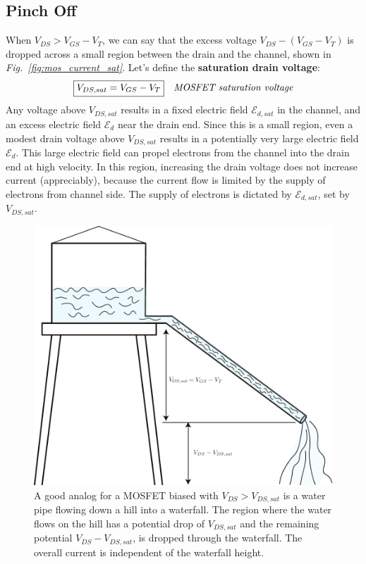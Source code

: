 \subsection{Pinch Off}
When $V_{DS} > V_{GS}-V_T$, we can say that the excess voltage $V_{DS} - (V_{GS}-V_T)$ is dropped across a small region between the drain and the channel, shown in \emph{Fig.~\ref{fig:mos_current_sat}}.  Let's define the \textbf{saturation drain voltage}:
    \begin{align}
        \Aboxed{V_{DS,sat} &= V_{GS} - V_T}
        &\textit{MOSFET saturation voltage}
        \label{eq:saturation_voltage}
    \end{align}
Any voltage above $V_{DS,sat}$ results in a fixed electric field $\mathcal{E}_{d,sat}$ in the channel, and an excess electric field $\mathcal{E}_d$ near the drain end.  Since this is a small region, even a modest drain voltage above $V_{DS,sat}$ results in a potentially very large electric field $\mathcal{E}_d$.  This large electric field can propel electrons from the channel into the drain end at high velocity.  In this region, increasing the drain voltage does not increase current (appreciably), because the current flow is limited by the supply of electrons from channel side.  The supply of electrons is dictated by $\mathcal{E}_{d,sat}$, set by $V_{DS,sat}$.
\newpage
\begin{figure}[t]
\centering
\includegraphics[width=\columnwidth]{waterfall}
\caption{A good analog for a MOSFET biased with $V_{DS} > V_{DS,sat}$ is a water pipe flowing down a hill into a waterfall.  The region where the water flows on the hill has a potential drop of $V_{DS,sat}$ and the remaining potential $V_{DS} - V_{DS,sat}$, is dropped through the waterfall.  The overall current is independent of the waterfall height.}
\label{fig:waterfall}
\end{figure}
